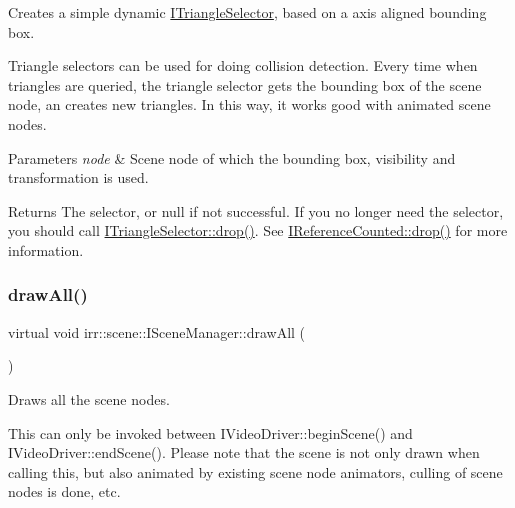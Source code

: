 Creates a simple dynamic \hyperlink{classirr_1_1scene_1_1ITriangleSelector}{I\+Triangle\+Selector}, based on a axis aligned bounding box. 

Triangle selectors can be used for doing collision detection. Every time when triangles are queried, the triangle selector gets the bounding box of the scene node, an creates new triangles. In this way, it works good with animated scene nodes. 
\begin{DoxyParams}{Parameters}
{\em node} & Scene node of which the bounding box, visibility and transformation is used. \\
\hline
\end{DoxyParams}
\begin{DoxyReturn}{Returns}
The selector, or null if not successful. If you no longer need the selector, you should call \hyperlink{classirr_1_1IReferenceCounted_a03856a09355b89d178090c4a5f738543}{I\+Triangle\+Selector\+::drop()}. See \hyperlink{classirr_1_1IReferenceCounted_a03856a09355b89d178090c4a5f738543}{I\+Reference\+Counted\+::drop()} for more information. 
\end{DoxyReturn}
\mbox{\label{classirr_1_1scene_1_1ISceneManager_a04240262904667c821bd9de5e5fd9b02}} 
\subsubsection{\texorpdfstring{draw\+All()}{drawAll()}}
{\footnotesize\ttfamily virtual void irr\+::scene\+::\+I\+Scene\+Manager\+::draw\+All (\begin{DoxyParamCaption}{ }\end{DoxyParamCaption})\hspace{0.3cm}{\ttfamily [pure virtual]}}



Draws all the scene nodes. 

This can only be invoked between I\+Video\+Driver\+::begin\+Scene() and I\+Video\+Driver\+::end\+Scene(). Please note that the scene is not only drawn when calling this, but also animated by existing scene node animators, culling of scene nodes is done, etc. \mbox{\label{classirr_1_1scene_1_1ISceneManager_a71391ee37dece0714d95c519f110010f}} 
